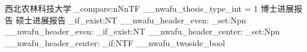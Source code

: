 \ExplSyntaxOn
\NewDocumentCommand{\MidtermRunningHeader}{}
  {
    西北农林科技大学
    \int_compare:nNnTF {\g__nwafu_thesis_type_int} = {1}
      {博士进展报告} {硕士进展报告}
  }
\cs_if_exist:NT \__nwafu_header_even:
  {
    \cs_set:Npn \__nwafu_header_even:
      {\small \nouppercase{\MidtermRunningHeader}}
  }
\cs_if_exist:NT \__nwafu_header_center:
  {
    \cs_set:Npn \__nwafu_header_center:
      {\small \nouppercase{\MidtermRunningHeader}}
  }
\NewDocumentCommand{\MidtermApplyRunningHeader}{}
  {
    \bool_if:NTF \g__nwafu_twoside_bool
      {\nwafuhead[EC]{\small\nouppercase{\MidtermRunningHeader}}}
      {\nwafuhead[C]{\small\nouppercase{\MidtermRunningHeader}}}
  }
\ExplSyntaxOff


